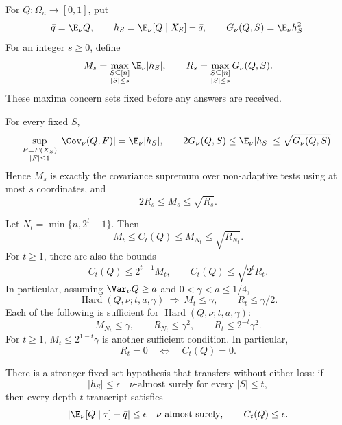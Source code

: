 \begin{definition}\label{ian:adaptive-fixed-set-quantities}
For \(Q:\Omega_n\to[0,1]\), put
\[
 \bar q=\E_\nu Q,\qquad
 h_S=\E_\nu[Q\mid X_S]-\bar q,\qquad
 G_\nu(Q,S)=\E_\nu h_S^2.
\]
For an integer \(s\ge0\), define
\[
 M_s=\max_{\substack{S\subseteq[n]\\|S|\le s}}\E_\nu|h_S|,
 \qquad
 R_s=\max_{\substack{S\subseteq[n]\\|S|\le s}}G_\nu(Q,S).
\]
These maxima concern sets fixed before any answers are received.
\end{definition}

\begin{proposition}\label{ian:adaptive-fixed-set-conversions}
For every fixed \(S\),
\[
 \sup_{\substack{F=F(X_S)\\|F|\le1}}
 |\Cov_\nu(Q,F)|=\E_\nu|h_S|,
 \qquad
 2G_\nu(Q,S)\le\E_\nu|h_S|\le\sqrt{G_\nu(Q,S)}.
\]
Hence \(M_s\) is exactly the covariance supremum over non-adaptive tests using at most \(s\) coordinates, and
\[
 2R_s\le M_s\le\sqrt{R_s}.
\]

Let \(N_t=\min\{n,2^t-1\}\). Then
\[
 M_t\le C_t(Q)\le M_{N_t}\le\sqrt{R_{N_t}}.
\]
For \(t\ge1\), there are also the bounds
\[
 C_t(Q)\le2^{t-1}M_t,
 \qquad
 C_t(Q)\le\sqrt{2^tR_t}.
\]
In particular, assuming \(\Var_\nu Q\ge a\) and \(0<\gamma<a\le1/4\),
\[
 \operatorname{Hard}(Q,\nu;t,a,\gamma)
 \ \Longrightarrow\
 M_t\le\gamma,\qquad R_t\le\gamma/2.
\]
Each of the following is sufficient for
\(\operatorname{Hard}(Q,\nu;t,a,\gamma)\):
\[
 M_{N_t}\le\gamma,\qquad
 R_{N_t}\le\gamma^2,\qquad
 R_t\le2^{-t}\gamma^2.
\]
For \(t\ge1\), \(M_t\le2^{1-t}\gamma\) is another sufficient condition.
In particular,
\[
 R_t=0\quad\Longleftrightarrow\quad C_t(Q)=0.
\]

There is a stronger fixed-set hypothesis that transfers without either loss: if
\[
 |h_S|\le\epsilon\quad \nu\text{-almost surely for every }|S|\le t,
\]
then every depth-\(t\) transcript satisfies
\[
 \left|\E_\nu[Q\mid\tau]-\bar q\right|\le\epsilon
 \quad \nu\text{-almost surely},
 \qquad C_t(Q)\le\epsilon.
\]
\end{proposition}
